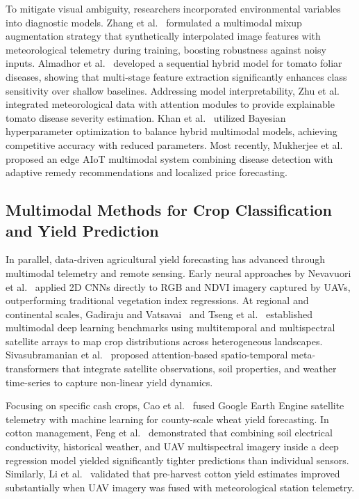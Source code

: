 \documentclass[conference]{IEEEtran}
\begin{document}
To mitigate visual ambiguity, researchers incorporated environmental variables into diagnostic models. Zhang et al.~\cite{zhang2024} formulated a multimodal mixup augmentation strategy that synthetically interpolated image features with meteorological telemetry during training, boosting robustness against noisy inputs. Almadhor et al.~\cite{almadhor2023} developed a sequential hybrid model for tomato foliar diseases, showing that multi-stage feature extraction significantly enhances class sensitivity over shallow baselines. Addressing model interpretability, Zhu et al.~\cite{zhu2025} integrated meteorological data with attention modules to provide explainable tomato disease severity estimation. Khan et al.~\cite{khan2024} utilized Bayesian hyperparameter optimization to balance hybrid multimodal models, achieving competitive accuracy with reduced parameters. Most recently, Mukherjee et al.~\cite{mukherjee2026} proposed an edge AIoT multimodal system combining disease detection with adaptive remedy recommendations and localized price forecasting.

\subsection{Multimodal Methods for Crop Classification and Yield Prediction}

In parallel, data-driven agricultural yield forecasting has advanced through multimodal telemetry and remote sensing. Early neural approaches by Nevavuori et al.~\cite{nevavuori2019} applied 2D CNNs directly to RGB and NDVI imagery captured by UAVs, outperforming traditional vegetation index regressions. At regional and continental scales, Gadiraju and Vatsavai~\cite{gadiraju2020} and Tseng et al.~\cite{tseng2023} established multimodal deep learning benchmarks using multitemporal and multispectral satellite arrays to map crop distributions across heterogeneous landscapes. Sivasubramanian et al.~\cite{sivasubramanian2026} proposed attention-based spatio-temporal meta-transformers that integrate satellite observations, soil properties, and weather time-series to capture non-linear yield dynamics.

Focusing on specific cash crops, Cao et al.~\cite{cao2021} fused Google Earth Engine satellite telemetry with machine learning for county-scale wheat yield forecasting. In cotton management, Feng et al.~\cite{feng2024} demonstrated that combining soil electrical conductivity, historical weather, and UAV multispectral imagery inside a deep regression model yielded significantly tighter predictions than individual sensors. Similarly, Li et al.~\cite{li2025} validated that pre-harvest cotton yield estimates improved substantially when UAV imagery was fused with meteorological station telemetry.
\end{document}

